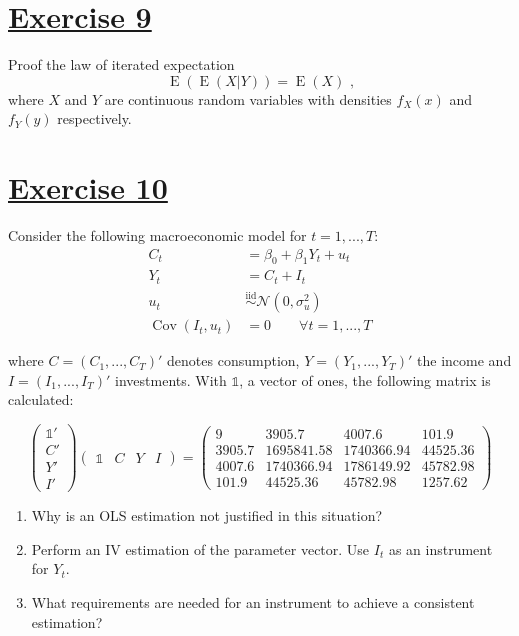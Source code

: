 \documentclass[captions=tableheading, 12pt, headings=small, parskip=half]{scrartcl}
\begin{document}
\section*{\underline{Exercise 9}}
Proof the law of iterated expectation
\[
	\operatorname{E}\left(\operatorname{E}(X|Y)\right) = \operatorname{E}(X)\text{ ,}
\]where $X$ and $Y$ are continuous random variables with densities $f_X(x)$ and $f_Y(y)$ respectively.

\section*{\underline{Exercise 10}}
Consider the following macroeconomic model for $t = 1, ..., T$:
\begin{align*}
	C_t &= \beta_0 + \beta_1 Y_t + u_t\\
	Y_t &= C_t + I_t\\
	u_t &\overset{\text{iid}}{\sim} \mathcal{N}(0, \sigma_u^2)\\
	\operatorname{Cov}(I_t, u_t) &= 0 \qquad \forall t=1,...,T
\end{align*}

where $C = (C_1,...,C_T)'$ denotes consumption, $Y = (Y_1,...,Y_T)'$ the income and $I = (I_1, ..., I_T)'$ investments. With $\mathds{1}$, a vector of ones, the following matrix is calculated:

\[
\begin{pmatrix}
	\mathds{1}' \\ 
	C' \\ 
	Y' \\ 
	I'
\end{pmatrix}
\begin{pmatrix}
\mathds{1} & C & Y & I
\end{pmatrix}
=
\begin{pmatrix}
	9 & 3905.7 & 4007.6 & 101.9 \\ 
	3905.7 & 1695841.58 & 1740366.94 & 44525.36 \\ 
	4007.6 & 1740366.94 & 1786149.92 & 45782.98 \\ 
	101.9 & 44525.36 & 45782.98 & 1257.62%
\end{pmatrix}%
\]

\begin{enumerate}[label = \alph*)]
	\item Why is an OLS estimation not justified in this situation?
	\item Perform an IV estimation of the parameter vector. Use $I_t$ as an instrument for $Y_t$.
	\item What requirements are needed for an instrument to achieve a consistent estimation?
\end{enumerate}
\end{document}
